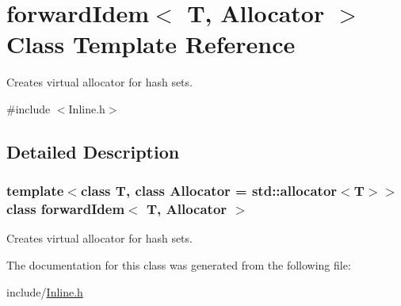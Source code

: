 \hypertarget{classforward_idem}{}\section{forward\+Idem$<$ T, Allocator $>$ Class Template Reference}
\label{classforward_idem}


Creates virtual allocator for hash sets.  




{\ttfamily \#include $<$Inline.\+h$>$}



\subsection{Detailed Description}
\subsubsection*{template$<$class T, class Allocator = std\+::allocator$<$\+T$>$$>$class forward\+Idem$<$ T, Allocator $>$}

Creates virtual allocator for hash sets. 

The documentation for this class was generated from the following file\+:\begin{DoxyCompactItemize}
\item 
include/\hyperlink{_inline_8h}{Inline.\+h}\end{DoxyCompactItemize}
